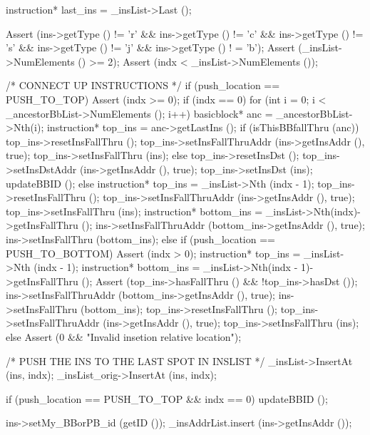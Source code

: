 \begin{DoxyCode}
                                                                                 
        {
    instruction* last_ins = _insList->Last ();

    Assert (ins->getType () != 'r' && ins->getType () != 'c' && 
            ins->getType () != 's' && ins->getType () != 'j' && ins->getType () !
      = 'b');
    Assert (_insList->NumElements () >= 2);
    Assert (indx < _insList->NumElements ());

    /* CONNECT UP INSTRUCTIONS */
    if (push_location == PUSH_TO_TOP) {
        Assert (indx >= 0);
        if (indx == 0) {
            for (int i = 0; i < _ancestorBbList->NumElements (); i++) {
                basicblock* anc = _ancestorBbList->Nth(i);
                instruction* top_ins = anc->getLastIns ();
                if (isThisBBfallThru (anc)) {
                    top_ins->resetInsFallThru ();
                    top_ins->setInsFallThruAddr (ins->getInsAddr (), true);
                    top_ins->setInsFallThru (ins);
                } else {
                    top_ins->resetInsDst ();
                    top_ins->setInsDstAddr (ins->getInsAddr (), true);
                    top_ins->setInsDst (ins);
                }
            }
            updateBBID ();
        } else {
            instruction* top_ins = _insList->Nth (indx - 1);
            top_ins->resetInsFallThru ();
            top_ins->setInsFallThruAddr (ins->getInsAddr (), true);
            top_ins->setInsFallThru (ins);
        }
        instruction* bottom_ins = _insList->Nth(indx)->getInsFallThru ();
        ins->setInsFallThruAddr (bottom_ins->getInsAddr (), true);
        ins->setInsFallThru (bottom_ins);
    } else if (push_location == PUSH_TO_BOTTOM) {
        Assert (indx > 0);
        instruction* top_ins = _insList->Nth (indx - 1);
        instruction* bottom_ins = _insList->Nth(indx - 1)->getInsFallThru ();
        Assert (top_ins->hasFallThru () && !top_ins->hasDst ());
        ins->setInsFallThruAddr (bottom_ins->getInsAddr (), true);
        ins->setInsFallThru (bottom_ins);
        top_ins->resetInsFallThru ();
        top_ins->setInsFallThruAddr (ins->getInsAddr (), true);
        top_ins->setInsFallThru (ins);
    } else {
        Assert (0 && "Invalid insetion relative location");
    }

    /* PUSH THE INS TO THE LAST SPOT IN INSLIST */
    _insList->InsertAt (ins, indx);
    _insList_orig->InsertAt (ins, indx);

    if (push_location == PUSH_TO_TOP && indx == 0) { updateBBID (); }

    ins->setMy_BBorPB_id (getID ());
    _insAddrList.insert (ins->getInsAddr ());
}
\end{DoxyCode}



